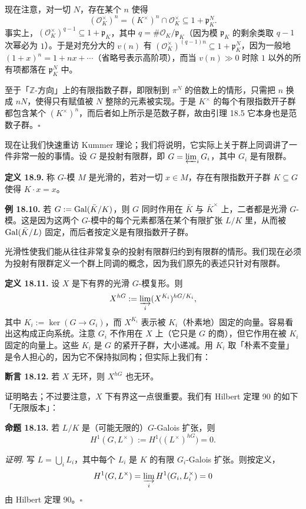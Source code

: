 现在注意，对一切 $N$，存在某个 $n$ 使得
\[
(\mathcal O_K^\times)^n=(K^\times)^n\cap\mathcal O_K^\times\subseteq 1+\mathfrak p_K^N.
\]
事实上，$(\mathcal O_K^\times)^{q-1}\subseteq 1+\mathfrak p_K$，其中 $q=\#\mathcal O_K/\mathfrak p_K$（因为模 $\mathfrak p_K$ 的剩余类取 $q-1$ 次幂必为 $1$）。于是对充分大的 $v(n)$ 有 $(\mathcal O_K^\times)^{(q-1)n}\subseteq 1+\mathfrak p_K^N$，因为一般地 $(1+x)^n=1+nx+\cdots$（省略号表示高阶项），而当 $v(n)\gg 0$ 时除 $1$ 以外的所有项都落在 $\mathfrak p_K^N$ 中。

至于「$\mathbb Z$-方向」上的有限指数子群，即限制到 $\pi^N$ 的倍数上的情形，只需把 $n$ 换成 $nN$，使得只有赋值被 $N$ 整除的元素被实现。于是 $K^\times$ 的每个有限指数开子群都包含某个 $(K^\times)^n$，而后者如上所示是范数子群，故由引理 18.5 它本身也是范数子群。\hfill$\square$

现在让我们快速重访 Kummer 理论；我们将说明，它实际上关于群上同调讲了一件非常一般的事情。设 $G$ 是投射有限群，即 $G=\varprojlim_i G_i$，其中 $G_i$ 是有限群。

\textbf{定义 18.9.} 称 $G$-模 $M$ 是光滑的，若对一切 $x\in M$，存在有限指数开子群 $K\subseteq G$ 使得 $K\cdot x=x$。

\textbf{例 18.10.} 若 $G:=\operatorname{Gal}(\bar K/K)$，则 $G$ 同时作用在 $\bar K$ 与 $\bar K^\times$ 上，二者都是光滑 $G$-模。这是因为这两个 $G$-模中的每个元素都落在某个有限扩张 $L/K$ 里，从而被 $\operatorname{Gal}(\bar K/L)$ 固定，而后者按定义是有限指数开子群。

光滑性使我们能从往往非常复杂的投射有限群归约到有限群的情形。我们现在必须为投射有限群定义一个群上同调的概念，因为我们原先的表述只针对有限群。

\textbf{定义 18.11.} 设 $X$ 是下有界的光滑 $G$-模复形。则
\[
X^{hG}:=\varinjlim_i (X^{K_i})^{hG/K_i},
\]
其中 $K_i:=\ker(G\to G_i)$，而 $X^{K_i}$ 表示被 $K_i$（朴素地）固定的向量。容易看出这构成正向系统。注意 $G_i$ 不作用在 $X$ 上（它只是 $G$ 的商），但它作用在被 $K_i$ 固定的向量上。这些 $K_i$ 是 $G$ 的紧开子群，大小递减。用 $K_i$ 取「朴素不变量」是令人担心的，因为它不保持拟同构；但实际上我们有：

\textbf{断言 18.12.} 若 $X$ 无环，则 $X^{hG}$ 也无环。

证明略去；不过要注意，$X$ 下有界这一点很重要。我们有 Hilbert 定理 90 的如下「无限版本」：

\textbf{命题 18.13.} 若 $L/K$ 是（可能无限的）$G$-Galois 扩张，则
\[
H^1(G,L^\times):=H^1\big((L^\times)^{hG}\big)=0.
\]

\textit{证明.} 写 $L=\bigcup_i L_i$，其中每个 $L_i$ 是 $K$ 的有限 $G_i$-Galois 扩张。则按定义，
\[
H^1(G,L^\times)=\varinjlim_i H^1(G_i,L_i^\times)=0
\]
由 Hilbert 定理 90。\hfill$\square$

